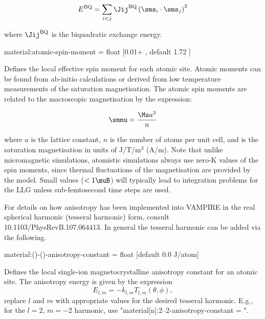 \begin{equation*}
E^{\mathrm{BQ}} = \sum_{i<j} \Jij^{\mathrm{BQ}} \left( \sms_i \cdot \sms_j \right)^2
\end{equation*}

\noindent where $\Jij^{\mathrm{BQ}}$ is the biquadratic exchange energy.

{\zicf material:atomic-spin-moment = float [0.01+ \muB, default 1.72 \muB]} Defines the local effective spin moment for each atomic site. Atomic moments can be found from ab-initio calculations or derived from low temperature measurements of the saturation magnetisation. The atomic spin moments are related to the macroscopic magnetisation by the expression:

\begin{equation*}
\smmu = \frac{\Ms a^3}{n}
\end{equation*}

\noindent where $a$ is the lattice constant, $n$ is the number of atoms per unit cell, and \Ms is the saturation magnetisation in units of J/T/m$^3$ (A/m). Note that unlike micromagnetic simulations, atomistic simulations always use zero-K values of the spin moments, since thermal fluctuations of the magnetisation are provided by the model. Small values ($<1 \muB$) will typically lead to integration problems for the LLG unless sub-femtosecond time steps are used.

\noindent For details on how anisotropy has been implemented into VAMPIRE in the real spherical harmonic (tesseral harmonic) form, consult 10.1103/PhysRevB.107.064413.
\noindent In general the tesseral harmonic can be added via the following.

{\zicf material:()-()-anisotropy-constant = float [default 0.0 J/atom]} Defines the local single-ion magnetocrystalline anisotropy constant for an atomic site. The anisotropy energy is given by the expression
\begin{equation*}
  E_{l,m} = -k_{l,m}T_{l,m}(\theta, \phi),
\end{equation*}
replace $l$ and $m$ with appropriate values for the desired tesseral harmonic.
E.g., for the $ l = 2 $, $ m = -2 $ harmonic, use "material[n]:2--2-anisotropy-constant = ".


